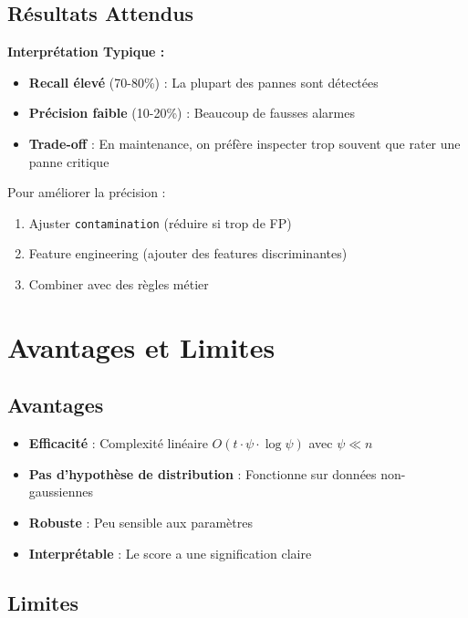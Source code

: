 \documentclass[a4paper,11pt]{article}
\begin{document}
\subsection{Résultats Attendus}

\begin{examplebox}
\textbf{Interprétation Typique :}

\begin{itemize}
    \item \textbf{Recall élevé} (70-80\%) : La plupart des pannes sont détectées
    \item \textbf{Précision faible} (10-20\%) : Beaucoup de fausses alarmes
    \item \textbf{Trade-off} : En maintenance, on préfère inspecter trop souvent que rater une panne critique
\end{itemize}

Pour améliorer la précision :
\begin{enumerate}
    \item Ajuster \texttt{contamination} (réduire si trop de FP)
    \item Feature engineering (ajouter des features discriminantes)
    \item Combiner avec des règles métier
\end{enumerate}
\end{examplebox}

\section{Avantages et Limites}

\subsection{Avantages}

\begin{itemize}
    \item \textbf{Efficacité} : Complexité linéaire $O(t \cdot \psi \cdot \log \psi)$ avec $\psi \ll n$
    \item \textbf{Pas d'hypothèse de distribution} : Fonctionne sur données non-gaussiennes
    \item \textbf{Robuste} : Peu sensible aux paramètres
    \item \textbf{Interprétable} : Le score a une signification claire
\end{itemize}

\subsection{Limites}
\end{document}
